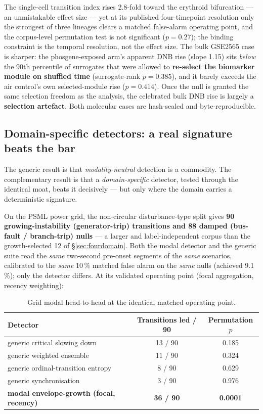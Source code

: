 \documentclass[11pt]{article}
\begin{document}
The single-cell transition index rises 2.8-fold toward the erythroid
bifurcation --- an unmistakable effect size --- yet at its published
four-timepoint resolution only the strongest of three lineages clears a
matched false-alarm operating point, and the corpus-level permutation
test is not significant ($p = 0.27$); the binding constraint is the
temporal resolution, not the effect size. The bulk GSE2565 case is
sharper: the phosgene-exposed arm's apparent DNB rise (slope 1.15) sits
\emph{below} the 90th percentile of surrogates that were allowed to
\textbf{re-select the biomarker module on shuffled time} (surrogate-rank
$p = 0.385$), and it barely exceeds the air control's own
selected-module rise ($p = 0.414$). Once the null is granted the same
selection freedom as the analysis, the celebrated bulk DNB rise is
largely a \textbf{selection artefact}. Both molecular cases are
hash-sealed and byte-reproducible.

\subsection{Domain-specific detectors: a real signature beats the bar}\label{sec:modal}

The generic result is that \emph{modality-neutral} detection is a
commodity. The complementary result is that a \emph{domain-specific}
detector, tested through the identical moat, beats it decisively --- but
only where the domain carries a deterministic signature.

On the PSML power grid, the non-circular disturbance-type split gives
\textbf{90 growing-instability (generator-trip) transitions and 88
damped (bus-fault / branch-trip) nulls} --- a larger and
label-independent corpus than the growth-selected 12 of
\S\ref{sec:fourdomain}. Both the modal detector and the generic suite
read the \emph{same} two-second pre-onset segments of the \emph{same}
scenarios, calibrated to the \emph{same} 10\,\% matched false alarm on
the \emph{same} nulls (achieved 9.1\,\%); only the detector differs. At
its validated operating point (focal aggregation, recency weighting):

\begin{table}[h!]
\centering
\begin{tabular}{lcc}
\toprule
Detector & Transitions led / 90 & Permutation $p$ \\
\midrule
generic critical slowing down & 13 / 90 & 0.185 \\
generic weighted ensemble & 11 / 90 & 0.324 \\
generic ordinal-transition entropy & 8 / 90 & 0.629 \\
generic synchronisation & 3 / 90 & 0.976 \\
\textbf{modal envelope-growth (focal, recency)} & \textbf{36 / 90} & \textbf{0.0001} \\
\bottomrule
\end{tabular}
\caption{Grid modal head-to-head at the identical matched operating point.}
\end{table}
\end{document}
